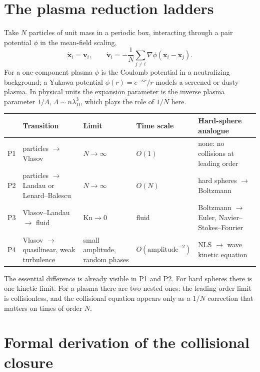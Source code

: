 \documentclass[11pt]{article}
\newcommand{\bx}{\mathbf{x}}
\newcommand{\bv}{\mathbf{v}}
\theoremstyle{definition}
\begin{document}
\section{The plasma reduction ladders}

Take $N$ particles of unit mass in a periodic box, interacting through a pair
potential $\phi$ in the mean-field scaling,
\begin{equation}
  \dot{\bx}_i = \bv_i, \qquad
  \dot{\bv}_i = -\frac{1}{N}\sum_{j\ne i}\nabla\phi(\bx_i - \bx_j).
  \label{eq:nbody}
\end{equation}
For a one-component plasma $\phi$ is the Coulomb potential in a neutralizing
background; a Yukawa potential $\phi(r) = e^{-\kappa r}/r$ models a screened
or dusty plasma. In physical units the expansion parameter is the inverse
plasma parameter $1/\Lambda$, $\Lambda\sim n\lambda_D^3$, which plays the
role of $1/N$ here.

\begin{center}
\renewcommand{\arraystretch}{1.45}
\begin{tabular}{>{\raggedright}p{0.6cm}>{\raggedright}p{3.6cm}>{\raggedright}p{3.4cm}>{\raggedright}p{2.6cm}p{3.6cm}}
  & Transition & Limit & Time scale & Hard-sphere analogue \\ \hline
  P1 & particles $\to$ Vlasov & $N\to\infty$ & $O(1)$
     & none: no collisions at leading order \\
  P2 & particles $\to$ Landau or Lenard--Balescu & $N\to\infty$
     & $O(N)$ & hard spheres $\to$ Boltzmann \\
  P3 & Vlasov--Landau $\to$ fluid & $\mathrm{Kn}\to 0$ & fluid
     & Boltzmann $\to$ Euler, Navier--Stokes--Fourier \\
  P4 & Vlasov $\to$ quasilinear, weak turbulence & small amplitude, random phases
     & $O(\text{amplitude}^{-2})$ & NLS $\to$ wave kinetic equation \\
\end{tabular}
\end{center}

The essential difference is already visible in P1 and P2. For hard spheres
there is one kinetic limit. For a plasma there are two nested ones: the
leading-order limit is collisionless, and the collisional equation appears
only as a $1/N$ correction that matters on times of order $N$.

\section{Formal derivation of the collisional closure}
\label{sec:formal}
\end{document}
